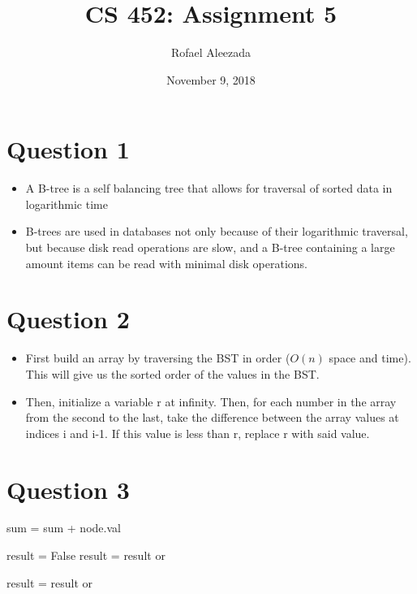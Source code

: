 \documentclass{article}
\title{CS 452: Assignment 5}
\date{November 9, 2018}
\author{Rofael Aleezada}
\begin{document}
	\maketitle
	
	\section{Question 1}
		\begin{itemize}
			\item A B-tree is a self balancing tree that allows for traversal of sorted data in logarithmic time
			\item B-trees are used in databases not only because of their logarithmic traversal, but because disk read operations are slow,
			and a B-tree containing a large amount items can be read with minimal disk operations.
		\end{itemize}

	\section{Question 2}
		\begin{itemize}
			\item First build an array by traversing the BST in order ($O(n)$ space and time). This will give us the sorted order of the values in the BST.
			\item Then, initialize a variable r at infinity. Then, for each number in the array from the second to the last, take the difference between the array values at indices i and i-1. If this value is less than r, replace r with said value.
		\end{itemize}
	
	\section{Question 3}
		\begin{algorithmic}
				\State sum = sum + node.val
					\State {}
				\EndIf
				
				
				\State result = False
					\State result = result or 
				\EndIf
				
					\State result = result or  
				\EndIf
				
				
				\State {}
			\EndFunction
		\end{algorithmic}
\end{document}
